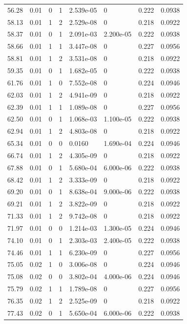 \documentclass[preview]{standalone}
\begin{document}
{{{\begin{tabular}{L{1.2cm}C{1.2cm} C{0.3cm}C{0.5cm} C{1.4cm}C{1.4cm} C{1.4cm}C{1.4cm}}
  56.28  &  0.01  & 0     &  1 &  2.539e-05  & 0  & 0.222 &  0.0938   \\ 
  58.13  &  0.01  & 1     &  2 &  2.529e-08  & 0  & 0.218 &  0.0922   \\ 
  58.37  &  0.01  & 0     &  1 &  2.091e-03  & 2.200e-05  & 0.222 &  0.0938   \\ 
  58.66  &  0.01  & 1     &  1 &  3.447e-08  & 0  & 0.227 &  0.0956   \\ 
  58.81  &  0.01  & 1     &  2 &  3.531e-08  & 0  & 0.218 &  0.0922   \\ 
  59.35  &  0.01  & 0     &  1 &  1.682e-05  & 0  & 0.222 &  0.0938   \\ 
  61.76  &  0.01  & 1     &  0 &  7.552e-08  & 0  & 0.224 &  0.0946   \\ 
  62.03  &  0.01  & 1     &  2 &  4.941e-09  & 0  & 0.218 &  0.0922   \\ 
  62.39  &  0.01  & 1     &  1 &  1.089e-08  & 0  & 0.227 &  0.0956   \\ 
  62.50  &  0.01  & 0     &  1 &  1.068e-03  & 1.100e-05  & 0.222 &  0.0938   \\ 
  62.94  &  0.01  & 1     &  2 &  4.803e-08  & 0  & 0.218 &  0.0922   \\ 
  65.34  &  0.01  & 0     &  0 &  0.0160  & 1.690e-04  & 0.224 &  0.0946   \\ 
  66.74  &  0.01  & 1     &  2 &  4.305e-09  & 0  & 0.218 &  0.0922   \\ 
  67.88  &  0.01  & 0     &  1 &  5.680e-04  & 6.000e-06  & 0.222 &  0.0938   \\ 
  68.42  &  0.01  & 1     &  2 &  3.333e-09  & 0  & 0.218 &  0.0922   \\ 
  69.20  &  0.01  & 0     &  1 &  8.638e-04  & 9.000e-06  & 0.222 &  0.0938   \\ 
  69.21  &  0.01  & 1     &  2 &  3.822e-09  & 0  & 0.218 &  0.0922   \\ 
  71.33  &  0.01  & 1     &  2 &  9.742e-08  & 0  & 0.218 &  0.0922   \\ 
  71.97  &  0.01  & 0     &  0 &  1.214e-03  & 1.300e-05  & 0.224 &  0.0946   \\ 
  74.10  &  0.01  & 0     &  1 &  2.303e-03  & 2.400e-05  & 0.222 &  0.0938   \\ 
  74.46  &  0.01  & 1     &  1 &  6.230e-09  & 0  & 0.227 &  0.0956   \\ 
  75.05  &  0.02  & 1     &  0 &  3.006e-08  & 0  & 0.224 &  0.0946   \\ 
  75.08  &  0.02  & 0     &  0 &  3.802e-04  & 4.000e-06  & 0.224 &  0.0946   \\ 
  75.79  &  0.02  & 1     &  1 &  1.789e-08  & 0  & 0.227 &  0.0956   \\ 
  76.35  &  0.02  & 1     &  2 &  2.525e-09  & 0  & 0.218 &  0.0922   \\ 
  77.43  &  0.02  & 0     &  1 &  5.650e-04  & 6.000e-06  & 0.222 &  0.0938   \\ 
\hline 
\end{tabular} 

}}}
\end{document}
